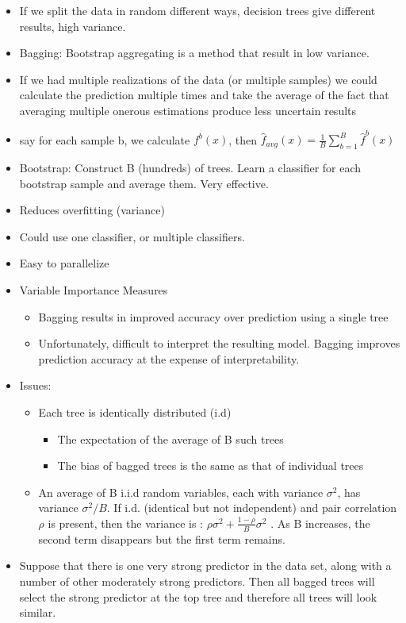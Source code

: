 \documentclass[
]{book}
\providecommand{\tightlist}{%
  \setlength{\itemsep}{0pt}\setlength{\parskip}{0pt}}
\begin{document}
\begin{itemize}
\item
  If we split the data in random different ways, decision trees give different results, high variance.\\
\item
  Bagging: Bootstrap aggregating is a method that result in low variance.\\
\item
  If we had multiple realizations of the data (or multiple samples) we could calculate the prediction multiple times and take the average of the fact that averaging multiple onerous estimations produce less uncertain results\\
\item
  say for each sample b, we calculate \(f^b(x)\), then \(\hat{f}_{avg} (x) = \frac{1}{B} \sum_{b=1}^{B} \hat{f}^b (x)\)
\item
  Bootstrap: Construct B (hundreds) of trees. Learn a classifier for each bootstrap sample and average them. Very effective.
\item
  Reduces overfitting (variance)
\item
  Could use one classifier, or multiple classifiers.
\item
  Easy to parallelize
\item
  Variable Importance Measures

  \begin{itemize}
  \tightlist
  \item
    Bagging results in improved accuracy over prediction using a single tree
  \item
    Unfortunately, difficult to interpret the resulting model. Bagging improves prediction accuracy at the expense of interpretability.
  \end{itemize}
\item
  Issues:

  \begin{itemize}
  \item
    Each tree is identically distributed (i.d)

    \begin{itemize}
    \tightlist
    \item
      The expectation of the average of B such trees
    \item
      The bias of bagged trees is the same as that of individual trees
    \end{itemize}
  \item
    An average of B i.i.d random variables, each with variance \(\sigma^2\), has variance \(\sigma^2/B\). If i.d. (identical but not independent) and pair correlation \(\rho\) is present, then the variance is : \(\rho \sigma^2 + \frac{1-\rho}{B} \sigma^2\) . As B increases, the second term disappears but the first term remains.
  \end{itemize}
\item
  Suppose that there is one very strong predictor in the data set, along with a number of other moderately strong predictors. Then all bagged trees will select the strong predictor at the top tree and therefore all trees will look similar.


\end{itemize}
\end{document}
